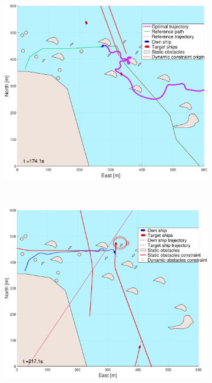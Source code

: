 \begin{figure}[ht]
\begin{subfigure}[b]{0.494\textwidth}
        \subcaption{}
    \end{subfigure}
    \hfill
    \begin{subfigure}[b]{0.494\textwidth}
        \centering
        \includegraphics[width=\textwidth]{Images/NewFigures/skjergard_m_trafikk_NEW/_Simple_1fig999_time=175}
        \subcaption{}
    \end{subfigure}
    \hfill
    \\
    \begin{subfigure}[b]{0.494\textwidth}
        \centering
        \includegraphics[width=\textwidth]{Images/NewFigures/skjergard_m_trafikk_NEW/_Simple_1fig1_time=218}

\end{subfigure}
\end{figure}
